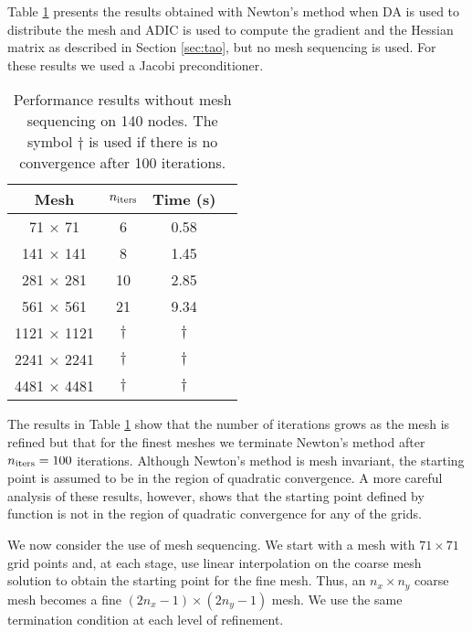 Table \ref{tab:no-mesh} presents the results obtained with
Newton's method when DA is used to distribute the mesh and
ADIC is used to compute the gradient and the Hessian matrix
as described in Section \ref{sec:tao}, but no
mesh sequencing is used.  For these results we used a 
Jacobi preconditioner.

\begin{table}
\begin{center}
\caption{Performance results without mesh sequencing on 140 nodes.
The symbol $ \dagger $ is used if there is no convergence after 100 iterations.
\label{tab:no-mesh}}
\begin{tabular}{cccc}
  Mesh &  $ \mbox{$ n_{\mathrm{iters}} $} $ & Time (s) \\
\hline
 71  $\times$  71   &  6           &   0.58   \\
 141 $\times$  141  &  8           &   1.45   \\
 281 $\times$  281  &  10          &   2.85   \\
 561 $\times$  561  &  21          &   9.34   \\
1121 $\times$  1121 &  $ \dagger $ &    $ \dagger $   \\
2241 $\times$  2241 &  $ \dagger $ &    $ \dagger $   \\
4481 $\times$  4481 &  $ \dagger $ &    $ \dagger $    \\
\hline
\end{tabular}
\end{center}
\end{table}


The results in Table \ref{tab:no-mesh} show that the number
of iterations grows as the mesh is refined but that for the
finest meshes we terminate Newton's method after 
$ \mbox{$ n_{\mathrm{iters}} $} = 100 $ iterations. 
Although Newton's method is mesh invariant,
the starting point is assumed to be
in the region of quadratic convergence.
A more careful analysis of these
results, however, shows that the starting point 
defined by function  is not in the
region of quadratic convergence for any of the grids.

We now consider the use of mesh sequencing.  We start with a
mesh with $ 71 \times 71 $ grid points and, at each
stage, use linear interpolation on the coarse mesh
solution to obtain the starting point for the fine mesh.  
Thus, an $ n_x \times n_y $ coarse mesh becomes
a fine $ (2n_x-1) \times (2n_y-1) $ mesh. We
use the same termination condition 
at each level of refinement.

